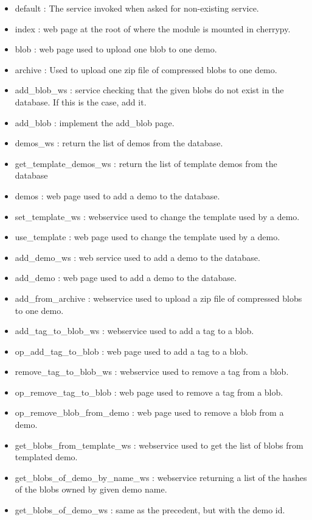 \begin{itemize}
\item default : The service invoked when asked for non-existing service.
\item index : web page at the root of where the module is mounted in cherrypy.
\item blob : web page used to upload one blob to one demo.
\item archive : Used to upload one zip file of compressed blobs to one demo.
\item add\_blob\_ws : service checking that the given blobs do not exist in the database. If this is the case, add it.
\item add\_blob : implement the add\_blob page.
\item demos\_ws : return the list of demos from the database.
\item get\_template\_demos\_ws : return the list of template demos from the database
\item demos : web page used to add a demo to the database.
\item set\_template\_ws : webservice used to change the template used by a demo.
\item use\_template : web page used to change the template used by a demo.
\item add\_demo\_ws : web service used to add a demo to the database.
\item add\_demo : web page used to add a demo to the database.
\item add\_from\_archive : webservice used to upload a zip file of compressed blobs to one demo.
\item add\_tag\_to\_blob\_ws : webservice used to add a tag to a blob.
\item op\_add\_tag\_to\_blob : web page used to add a tag to a blob.
\item remove\_tag\_to\_blob\_ws : webservice used to remove a tag from a blob.
\item op\_remove\_tag\_to\_blob : web page used to remove a tag from a blob.
\item op\_remove\_blob\_from\_demo : web page used to remove a blob from a demo.
\item get\_blobs\_from\_template\_ws : webservice used to get the list of blobs from templated demo.
\item get\_blobs\_of\_demo\_by\_name\_ws : webservice returning a list of the hashes of the blobs owned by given demo name.
\item get\_blobs\_of\_demo\_ws : same as the precedent, but with the demo id.

\end{itemize}
